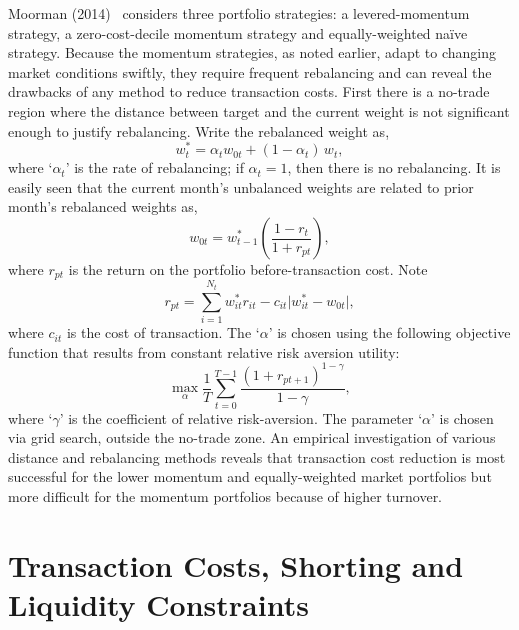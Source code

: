 Moorman (2014)~\cite{moorman} considers three portfolio strategies: a levered-momentum strategy, a zero-cost-decile momentum strategy and equally-weighted na\"ive strategy. Because the momentum strategies, as noted earlier, adapt to changing market conditions swiftly, they require frequent rebalancing and can reveal the drawbacks of any method to reduce transaction costs. First there is a no-trade region where the distance between target and the current weight is not significant enough to justify rebalancing. Write the rebalanced weight as,
	\begin{equation} \label{eqn:rebalanceweight}
	w_t^*= \alpha_t w_{0t} + (1 - \alpha_t)\, w_t,
	\end{equation}
where `$\alpha_t$' is the rate of rebalancing; if $\alpha_t=1$, then there is no rebalancing. It is easily seen that the current month's unbalanced weights are related to prior month's rebalanced weights as,
	\begin{equation} \label{eqn:priorrebalanced}
	w_{0t}= w_{t-1}^* \left( \dfrac{1-r_t}{1+r_{pt}} \right),
	\end{equation}
where $r_{pt}$ is the return on the portfolio before-transaction cost. Note
	\begin{equation}\label{eqn:transnote}
	r_{pt}= \sum_{i=1}^{N_t} w_{it}^* r_{it} - c_{it} \lvert w_{it}^* - w_{0t} \rvert,
	\end{equation}
where $c_{it}$ is the cost of transaction. The `$\alpha$' is chosen using the following objective function that results from constant relative risk aversion utility:
	\begin{equation}\label{eqn:objectivefun}
	\max_\alpha \dfrac{1}{T} \sum_{t=0}^{T-1} \dfrac{(1 + r_{pt+1})^{1-\gamma}}{1-\gamma},
	\end{equation}
where `$\gamma$' is the coefficient of relative risk-aversion. The parameter `$\alpha$' is chosen via grid search, outside the no-trade zone. An empirical investigation of various distance and rebalancing methods reveals that transaction cost reduction is most successful for the lower momentum and equally-weighted market portfolios but more difficult for the momentum portfolios because of higher turnover. 



\section{Transaction Costs, Shorting and Liquidity Constraints}


